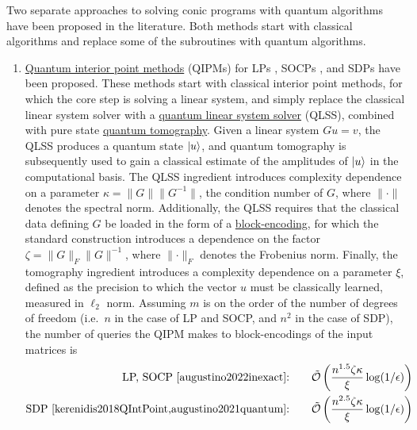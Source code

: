 \begin{refsection}
Two separate approaches to solving conic programs with quantum algorithms have been proposed in the literature. Both methods start with classical algorithms and replace some of the subroutines with quantum algorithms. 
\begin{enumerate}
    \item \hyperref[prim:QIPM]{Quantum interior point methods} (QIPMs) for LPs \cite{kerenidis2018QIntPoint}, SOCPs \cite{kerenidis2019QAlgsSecondOrderConeSVM,augustino2022inexact}, and SDPs \cite{kerenidis2018QIntPoint,augustino2021quantum,huang2022fasterQuantumIPM} have been proposed. These methods start with classical interior point methods, for which the core step is solving a linear system, and simply replace the classical linear system solver with a \hyperref[prim:QuantumLinearSystemSolvers]{quantum linear system solver} (QLSS), combined with pure state \hyperref[prim:Tomography]{quantum tomography}. Given a linear system $Gu = v$, the QLSS produces a quantum state $\lvert u\rangle$, and quantum tomography is subsequently used to gain a classical estimate of the amplitudes of $\lvert u\rangle$ in the computational basis.  The QLSS ingredient introduces complexity dependence on a parameter $\kappa=\lVert G \rVert \lVert G^{-1}\rVert$, the condition number  of $G$, where $\lVert \cdot \rVert$ denotes the spectral norm. Additionally, the QLSS requires that the classical data defining $G$ be loaded in the form of a \hyperref[prim:BlockEncodingsClassical]{block-encoding}, for which the standard construction introduces a dependence on the factor $\zeta = \lVert G \rVert_F \lVert G \rVert^{-1}$, where $\lVert \cdot \rVert_F$ denotes the Frobenius norm. Finally, the tomography ingredient introduces a complexity dependence on a parameter $\xi$, defined as the precision to which the vector $u$ must be classically learned, measured in $\ell_2$ norm. Assuming $m$ is on the order of the number of degrees of freedom (i.e.~$n$ in the case of LP and SOCP, and $n^2$ in the case of SDP), the number of queries the QIPM makes to block-encodings of the input matrices is
    \begin{equation}
        \begin{split}
            \text{LP, SOCP  \cite{augustino2022inexact}:}& \qquad \tilde{\mathcal{O}}\left(\frac{n^{1.5}\zeta \kappa}{\xi}\log(1/\epsilon)\right) \\
            \text{SDP  \cite{kerenidis2018QIntPoint,augustino2021quantum}:}& \qquad \tilde{\mathcal{O}}\left(\frac{n^{2.5}\zeta \kappa}{\xi}\log(1/\epsilon)\right)
        \end{split}

\end{equation}
\end{enumerate}
\end{refsection}
